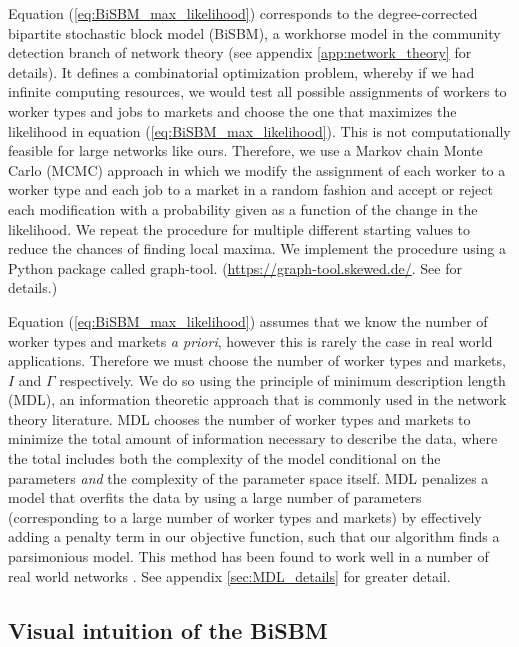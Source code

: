 \documentclass[12pt]{article}
\theoremstyle{definition}
\theoremstyle{plain}
\begin{document}
Equation (\ref{eq:BiSBM_max_likelihood}) corresponds to the degree-corrected bipartite stochastic block model (BiSBM), a workhorse model in the community detection branch of network theory (see appendix \ref{app:network_theory} for details). It defines a combinatorial optimization problem, whereby if we had infinite computing resources, we would test all possible  assignments of workers to worker types and jobs to markets and choose the one that maximizes the likelihood in equation (\ref{eq:BiSBM_max_likelihood}). This is not computationally feasible for large networks like ours. Therefore, we use a Markov chain Monte Carlo (MCMC) approach in which we modify the assignment of each worker to a worker type and each job to a market in a random fashion and accept or reject each modification with a probability given as a function of the change in the likelihood. We repeat the procedure for multiple different starting values to reduce the chances of finding local maxima. We implement the procedure using a Python package called graph-tool. (\url{https://graph-tool.skewed.de/}. See \citet{Peixoto2014_efficient} for details.)


Equation (\ref{eq:BiSBM_max_likelihood}) assumes that we know the number of worker types and markets \emph{a priori}, however this is rarely the case in real world applications. Therefore we must choose the number of worker types and markets, $I$ and $\Gamma$ respectively. We do so using the principle of minimum description length (MDL), an information theoretic approach that is commonly used in the network theory literature. MDL chooses the number of worker types and markets to minimize the total amount of information necessary to describe the data, where the total includes both the complexity of the model conditional on the parameters \emph{and} the complexity of the parameter space itself. MDL penalizes a model that overfits the data by using a large number of parameters (corresponding to a large number of worker types and markets) by effectively adding a penalty term in our objective function, such that our algorithm finds a parsimonious model. This method has been found to work well in a number of real world networks \citep{Peixoto2013,Peixoto2014,RosvallBergstrom2007}. See appendix \ref{sec:MDL_details} for greater detail.




\subsection{Visual intuition of the BiSBM}
\end{document}
